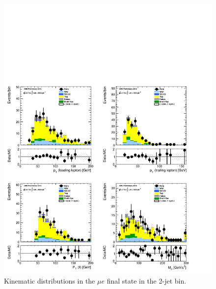 \begin{figure}[!hbtp]
\centering
\includegraphics[width=1\textwidth]{figures/ww_analysis20_0_ALL_me_2j.pdf}
\caption{Kinematic distributions in the $\mu e$ final state in the 2-jet bin.}
\label{fig:xs_kinematics_me_2j}
\end{figure}
